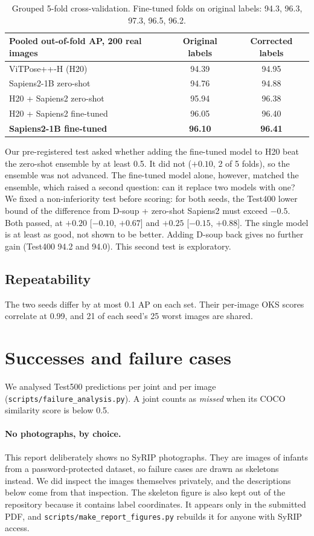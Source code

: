 \documentclass[11pt]{article}
\newcommand{\repo}[1]{\texttt{#1}}
\begin{document}
\begin{table}[h]
\centering\small
\begin{tabular}{@{}lcc@{}}
\toprule
Pooled out-of-fold AP, 200 real images & Original labels & Corrected labels \\
\midrule
ViTPose++-H (H20) & 94.39 & 94.95 \\
Sapiens2-1B zero-shot & 94.76 & 94.88 \\
H20 + Sapiens2 zero-shot & 95.94 & 96.38 \\
H20 + Sapiens2 fine-tuned & 96.05 & 96.40 \\
\textbf{Sapiens2-1B fine-tuned} & \textbf{96.10} & \textbf{96.41} \\
\bottomrule
\end{tabular}
\caption{Grouped 5-fold cross-validation. Fine-tuned folds on original labels: 94.3, 96.3, 97.3, 96.5, 96.2.}
\label{tab:cv}
\end{table}

Our pre-registered test asked whether adding the fine-tuned model to H20 beat the zero-shot ensemble by at least 0.5. It did not ($+0.10$, 2 of 5 folds), so the ensemble was not advanced. The fine-tuned model alone, however, matched the ensemble, which raised a second question: can it replace two models with one? We fixed a non-inferiority test before scoring: for both seeds, the Test400 lower bound of the difference from D-soup + zero-shot Sapiens2 must exceed $-0.5$. Both passed, at $+0.20$ [$-0.10$, $+0.67$] and $+0.25$ [$-0.15$, $+0.88$]. The single model is at least as good, not shown to be better. Adding D-soup back gives no further gain (Test400 94.2 and 94.0). This second test is exploratory.

\subsection{Repeatability}
The two seeds differ by at most 0.1 AP on each set. Their per-image OKS scores correlate at 0.99, and 21 of each seed's 25 worst images are shared.

\section{Successes and failure cases}
\label{sec:failure}
We analysed Test500 predictions per joint and per image (\repo{scripts/failure\_analysis.py}). A joint counts as \emph{missed} when its COCO similarity score is below 0.5.

\paragraph{No photographs, by choice.} This report deliberately shows no SyRIP photographs. They are images of infants from a password-protected dataset, so failure cases are drawn as skeletons instead. We did inspect the images themselves privately, and the descriptions below come from that inspection. The skeleton figure is also kept out of the repository because it contains label coordinates. It appears only in the submitted PDF, and \repo{scripts/make\_report\_figures.py} rebuilds it for anyone with SyRIP access.
\end{document}
